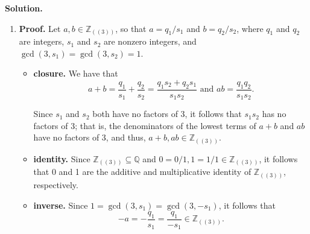 \documentclass[9pt]{article}
\newcommand{\Z}{\mathbb{Z}}
\newcommand{\Q}{\mathbb{Q}}
\begin{document}
\begin{enumerate}
      \textbf{Solution.}
      
      \begin{enumerate}
         \item \textbf{Proof.} Let $a, b \in \Z_{((3))}$, so that $a = q_1/s_1$
               and $b = q_2/s_2$, where $q_1$ and $q_2$ are integers, $s_1$ and
               $s_2$ are nonzero integers, and
               $\gcd(3, s_1) = \gcd(3, s_2) = 1$.

               \begin{itemize}
                  \item \textbf{closure.} We have that
                        $$a + b = \frac{q_1}{s_1} + \frac{q_2}{s_2} =
                          \frac{q_1s_2 + q_2s_1}{s_1s_2} \text{ and }
                          ab = \frac{q_1q_2}{s_1s_2}.$$
         
                        Since $s_1$ and $s_2$ both have no factors of 3, it
                        follows that $s_1s_2$ has no factors of 3; that is, the
                        denominators of the lowest terms of $a + b$ and $ab$
                        have no factors of 3, and thus,
                        $a + b, ab \in \Z_{((3))}$.
                  \item \textbf{identity.} Since $\Z_{((3))} \subseteq \Q$ and
                        $0 = 0/1, 1 = 1/1\in\Z_{((3))}$, it follows that 0 and 1
                        are the additive and multiplicative identity of
                        $\Z_{((3))}$, respectively.
                  \item \textbf{inverse.} Since
                        $1 = \gcd(3, s_1) = \gcd(3, -s_1)$, it follows that
                        $$-a = -\frac{q_1}{s_1} = 
                          \frac{q_1}{-s_1} \in \Z_{((3))}.$$
               \end{itemize}


\end{enumerate}
\end{enumerate}
\end{document}
